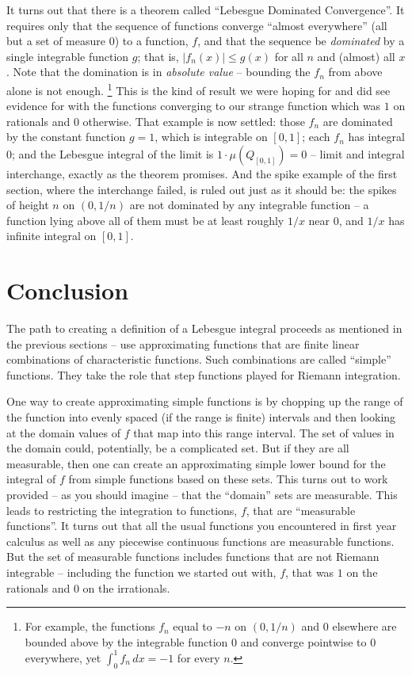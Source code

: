 \documentclass{article}
\begin{document}
It turns out that there is a theorem called ``Lebesgue Dominated Convergence''.
It requires only that the sequence of functions converge ``almost everywhere''
(all but a set of measure $0$) to a function, $f$, and that the sequence be
{\em dominated\/} by a single integrable function $g$; that is,
$|f_n(x)| \le g(x)$ for all $n$ and (almost) all $x$.  Note that the
domination is in {\em absolute value\/} -- bounding the $f_n$ from above
alone is not enough.%
\footnote{For example, the functions $f_n$ equal to $-n$ on $(0, 1/n)$ and
$0$ elsewhere are bounded above by the integrable function $0$ and converge
pointwise to $0$ everywhere, yet $\int_0^1 f_n \, dx = -1$ for every $n$.}
This is the kind of result we were hoping for and did see evidence for with 
the functions converging to our strange function which was $1$ on rationals
and $0$ otherwise. That example is now settled: those $f_n$ are dominated by
the constant function $g = 1$, which is integrable on $[0,1]$; each $f_n$ has
integral $0$; and the Lebesgue integral of the limit is
$1 \cdot \mu(Q_{[0,1]}) = 0$ -- limit and integral interchange, exactly as the
theorem promises. And the spike example of the first section, where the
interchange failed, is ruled out just as it should be: the spikes of height
$n$ on $(0, 1/n)$ are not dominated by any integrable function -- a function
lying above all of them must be at least roughly $1/x$ near $0$, and $1/x$
has infinite integral on $[0,1]$.


\section{Conclusion}

The path to creating a definition of a Lebesgue integral proceeds as mentioned 
in the previous sections -- use approximating functions that are finite linear
combinations of characteristic functions. Such combinations are called ``simple''
functions. They take the role that step functions played for Riemann integration. 

One way to create approximating simple functions is by chopping up the range 
of the function into evenly spaced (if the range is finite) intervals and then 
looking at the domain values of $f$ that map into this range interval. 
The set of values in the domain could, potentially, be a complicated set. 
But if they are all measurable, then one can create an approximating simple 
lower bound for the integral of $f$ from simple functions based on these sets. 
This turns out to work provided -- as you should imagine -- that the ``domain'' 
sets are measurable. This leads to restricting the integration to functions, $f$, 
that are ``measurable functions''. It turns out that all the usual functions you 
encountered in first year calculus as well as any piecewise continuous functions 
are measurable functions. But the set of measurable functions includes functions 
that are not Riemann integrable -- including the function we started out with, $f$, 
that was $1$ on the rationals and $0$ on the irrationals.
\end{document}
